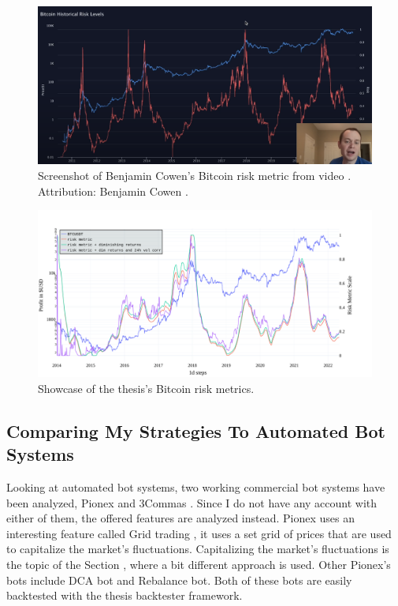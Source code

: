 \begin{figure}[!hbt]
    \centering
    \includegraphics[width=\columnwidth]{figures/cowen-riskmetric-screenshot.png}
    \caption{Screenshot of Benjamin Cowen's Bitcoin risk metric from video \cite{youtube:bitcoin-risk-metric-latest}. Attribution: Benjamin Cowen \cite{youtube:cowen-yt-channel}.}
    \label{figure-cowen-screenshot}
\end{figure}

\begin{figure}[!hbt]
    \centering
    \includegraphics[width=\columnwidth]{figures/combined-bitcoin-metrics.pdf}
    \caption{Showcase of the thesis's Bitcoin risk metrics.}
    \label{figure-combined-bitcoin-riskmetric}
\end{figure}

\subsection{Comparing My Strategies To Automated Bot Systems}
Looking at automated bot systems, two working commercial bot systems have been analyzed, Pionex \cite{pionex} and 3Commas \cite{3commas}. Since I do not have any account with either of them, the offered features are analyzed instead. Pionex uses an interesting feature called Grid trading \cite{pionex-grid-trading}, it uses a set grid of prices that are used to capitalize the market's fluctuations. Capitalizing the market's fluctuations is the topic of the Section \cite{section-testing-day-trading}, where a bit different approach is used. Other Pionex's bots include DCA bot and Rebalance bot. Both of these bots are easily backtested with the thesis backtester framework.

